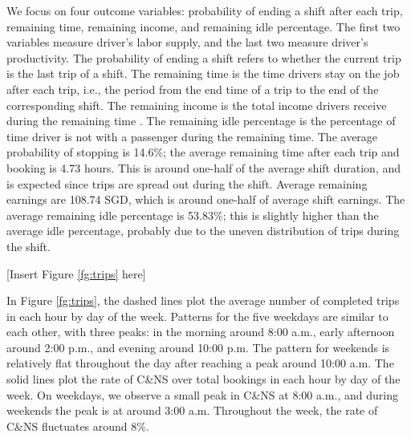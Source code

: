 \documentclass[reviewmode]{restud}
\begin{document}
We focus on four outcome variables: probability of ending a shift after each trip, remaining time, remaining income, and remaining idle percentage. The first two variables measure driver's labor supply, and the last two measure driver's productivity. The probability of ending a shift refers to whether the current trip is the last trip of a shift. The remaining time is the time drivers stay on the job after each trip, i.e., the period from the end time of a trip to the end of the corresponding shift. The remaining income is the total income drivers receive during the remaining time%
. The remaining idle percentage is the percentage of time driver is not with a passenger during the remaining time. The average probability of stopping is 14.6\%; the average remaining time after each trip and booking is 4.73 hours. This is around one-half of the average shift duration, and is expected since trips are spread out during the shift. Average remaining earnings are 108.74 SGD, which is around one-half of average shift earnings. The average remaining idle percentage is 53.83\%; this is slightly higher than the average idle percentage, probably due to the uneven distribution of trips during the shift.

\begin{center}
	[Insert Figure \ref{fg:trips} here]
\end{center}

In Figure \ref{fg:trips}, the dashed lines plot the average number of completed trips in each hour by day of the week. Patterns for the five weekdays are similar to each other, with three peaks: in the morning around 8:00 a.m., early afternoon around 2:00 p.m., and evening around 10:00 p.m. The pattern for weekends is relatively flat throughout the day after reaching a peak around 10:00 a.m. The solid lines plot the rate of C\&NS over total bookings in each hour by day of the week. On weekdays, we observe a small peak in C\&NS at 8:00 a.m., and during weekends the peak is at around 3:00 a.m. Throughout the week, the rate of C\&NS fluctuates around 8\%.
\end{document}
